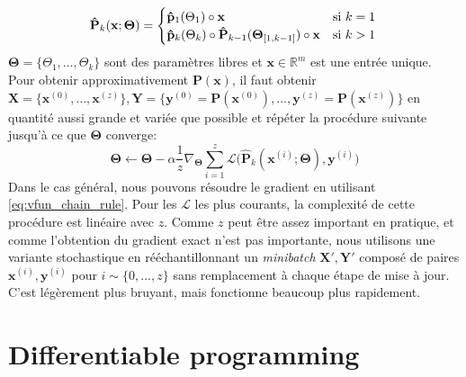 %
\begin{equation} \label{eq:recursive_parametric_eq}
\mathbf{\hat P}_k(\mathbf{x}; \bm\Theta) = \begin{cases} \mathbf{\hat p}_1(\Theta_1)\circ\mathbf{x} &\text{si } k=1\\ \mathbf{\hat p}_k(\Theta_k)\circ \mathbf{\hat P}_{k-1}(\bm\Theta_{[1, k-1]})\circ\mathbf{x}&\text{si } k > 1 \end{cases} \\
\end{equation}
%
$\bm\Theta = \{\Theta_1, \dots, \Theta_k\}$ sont des paramètres libres et $\mathbf{x} \in \mathbb{R}^m$ est une entrée unique. Pour obtenir approximativement $\mathbf{P}(\mathbf x)$, il faut obtenir $\mathbf{X} = \{\mathbf{x}^{(0)}, \dots, \mathbf{x}^{(z)}\}, \mathbf{Y} = \{\mathbf{y}^{(0)} = \mathbf{P}(\mathbf{x}^{(0)}), \dots, \mathbf{y}^{(z)} = \mathbf{P}(\mathbf{x}^{(z)})\}$ en quantité aussi grande et variée que possible et répéter la procédure suivante jusqu'à ce que $\bm\Theta$ converge:
%
\begin{equation} \label{eq:stochastic_grad_descent}
\bm\Theta \leftarrow \bm\Theta - \alpha\frac{1}{z}\nabla_{\bm\Theta} \sum_{i=1}^z\mathcal{L}\big(\mathbf{\hat P}_k(\mathbf{x}^{(i)}; \bm\Theta), \mathbf{y}^{(i)}\big)
\end{equation}
%
Dans le cas général, nous pouvons résoudre le gradient en utilisant \autoref{eq:vfun_chain_rule}. Pour les $\mathcal{L}$ les plus courants, la complexité de cette procédure est linéaire avec $z$. Comme $z$ peut être assez important en pratique, et comme l'obtention du gradient exact n'est pas importante, nous utilisons une variante stochastique en rééchantillonnant un \textit{minibatch} $\mathbf{X}', \mathbf{Y}'$ composé de paires $\mathbf{x}^{(i)}, \mathbf{y}^{(i)}$ pour $i \sim \{0, \dots, z\}$ sans remplacement à chaque étape de mise à jour. C'est légèrement plus bruyant, mais fonctionne beaucoup plus rapidement.

\section{Differentiable programming}\label{sec:differentiable-programming}

